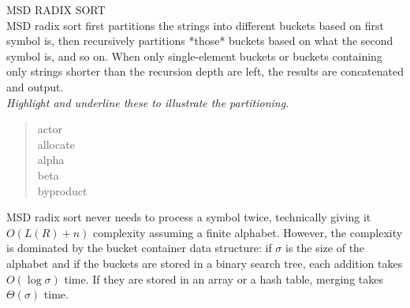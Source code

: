 {\sffamily\normalsize{\color{sciorange} MSD RADIX SORT}}\vspace{1mm}\\
\footnotesize 
MSD radix sort first partitions the strings into different buckets based on
first symbol is, then recursively partitions *those* buckets based on what
the second symbol is, and so on.  When only single-element buckets or buckets
containing only strings shorter than the recursion depth are left, the results
are concatenated and output.\\

{\em Highlight and underline these to illustrate the partitioning.}
\begin{quote}
    actor\\
    allocate\\
    alpha\\
    beta\\
    byproduct\\
\end{quote}
MSD radix sort never needs to process a symbol twice, technically giving it
$O(L(R) + n)$ complexity assuming a finite alphabet.  However, the complexity
is dominated by the bucket container data structure: if $\sigma$ is the size of the
alphabet and if the buckets are stored in a binary search tree, each addition
takes $O(\log \sigma)$ time.  If they are stored in an array or a hash table, merging
takes $\Theta(\sigma)$ time.